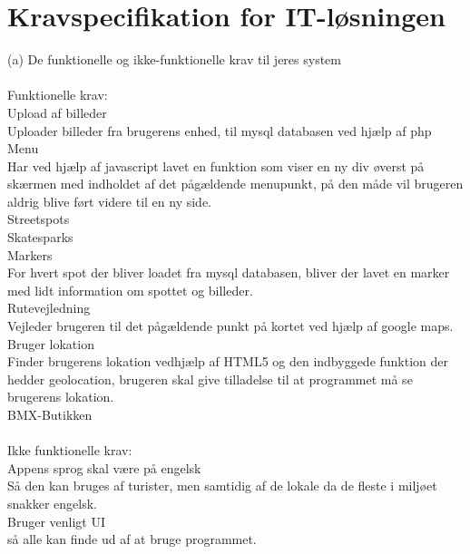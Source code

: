 \documentclass[12pt]{article}
\begin{document}
\pagebreak

\section{Kravspecifikation for IT-løsningen}
(a) De funktionelle og ikke-funktionelle krav til jeres system\\\\
Funktionelle krav:\\
Upload af billeder\\ Uploader billeder fra brugerens enhed, til mysql databasen ved hjælp af php\\
Menu\\ Har ved hjælp af javascript lavet en funktion som viser en ny div øverst på skærmen med indholdet af det pågældende menupunkt, på den måde vil brugeren aldrig blive ført videre til en ny side.\\
Streetspots\\
Skatesparks\\
Markers\\ For hvert spot der bliver loadet fra mysql databasen, bliver der lavet en marker med lidt information om spottet og billeder.\\
Rutevejledning\\ Vejleder brugeren til det pågældende punkt på kortet ved hjælp af google maps.\\
Bruger lokation\\ Finder brugerens lokation vedhjælp af HTML5 og den indbyggede funktion der hedder geolocation, brugeren skal give tilladelse til at programmet må se brugerens lokation.\\
BMX-Butikken\\\\
Ikke funktionelle krav:\\
Appens sprog skal være på engelsk\\ Så den kan bruges af turister, men samtidig af de lokale da de fleste i miljøet snakker engelsk.\\
Bruger venligt UI\\ så alle kan finde ud af at bruge programmet.\\
\pagebreak\\
\end{document}
